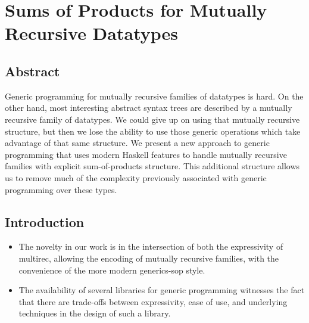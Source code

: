 \chapter{Sums of Products for Mutually Recursive Datatypes}

\section{Abstract}
Generic programming for mutually recursive families of datatypes is hard. On the other hand, most interesting abstract syntax trees are described by a mutually recursive family of datatypes. We could give up on using that mutually recursive structure, but then we lose the ability to use those generic operations which take advantage of that same structure. We present a new approach to generic programming that uses modern Haskell features to handle mutually recursive families with explicit sum-of-products structure. This additional structure allows us to remove much of the complexity previously associated with generic programming over these types.

\section{Introduction}
\begin{itemize}
    \item The novelty in our work is in the intersection of both the expressivity of multirec, allowing the encoding of mutually recursive families, with the convenience of the more modern generics-sop style.
    \item The availability of several libraries for generic programming witnesses the fact that there are trade-offs between expressivity, ease of use, and underlying techniques in the design of such a library.
\end{itemize}

